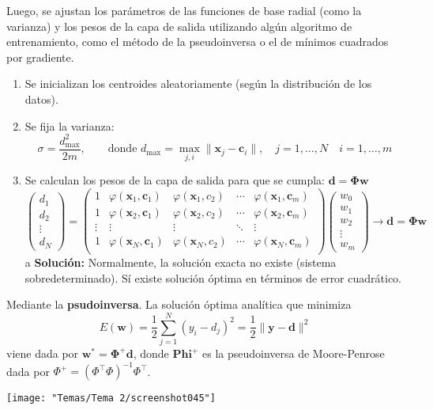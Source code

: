 Luego, se ajustan los parámetros de las funciones de base radial (como la varianza) y los pesos de la capa de salida utilizando algún algoritmo de entrenamiento, como el método de la pseudoinversa o el de mínimos cuadrados por gradiente.
\begin{enumerate}[label=\arabic*)]
	\item Se inicializan los centroides aleatoriamente (según la distribución de los datos).
	\item Se fija la varianza: \[ \boxed{\sigma=\dfrac{d_{\max}^2}{2m}},\qquad\text{donde }d_{\max}=\max_{j,i}\|\mathbf{x}_j-\mathbf{c}_i\|,\quad j=1,\dots,N \quad i=1,\dots,m \]
	\item Se calculan los pesos de la capa de salida para que se cumpla: $\mathbf{d=\Phi w}$ \[ \begin{pmatrix}
		d_1\\
		d_2\\
		\vdots\\
		d_N
	\end{pmatrix}=\begin{pmatrix}
		1 &\varphi(\mathbf{x}_1,\mathbf{c}_1) & \varphi(\mathbf{x}_1,c_2) & \cdots & \varphi(\mathbf{x}_1,\mathbf{c}_m)\\
		1 &\varphi(\mathbf{x}_2,\mathbf{c}_1) & \varphi(\mathbf{x}_2,c_2) & \cdots & \varphi(\mathbf{x}_2,\mathbf{c}_m)\\
		\vdots & \vdots & \vdots & \ddots & \vdots\\
		1 & \varphi(\mathbf{x}_N,\mathbf{c}_1) & \varphi(\mathbf{x}_N,c_2) & \cdots & \varphi(\mathbf{x}_N,\mathbf{c}_m)\\
	\end{pmatrix}\begin{pmatrix}
		w_0\\
		w_1\\
		w_2\\
		\vdots\\
		w_m
	\end{pmatrix}\longrightarrow\mathbf{d=\Phi w} \]a
	\textbf{Solución:} Normalmente, la solución exacta no existe (sistema sobredeterminado). Sí existe solución óptima en términos de error cuadrático.
\end{enumerate}
\begin{minipage}{0.65\textwidth}
Mediante la \textbf{psudoinversa}. La solución óptima analítica que minimiza \[ E(\mathbf{w})=\dfrac{1}{2}\sum_{j=1}^{N}(y_i-d_j)^2=\dfrac{1}{2}\|\mathbf{y-d}\|^2 \]viene dada por $\mathbf{w^*=\Phi^+d}$, donde $\mathbf{Phi^+}$ es la pseudoinversa de Moore-Penrose dada por $\Phi^+=(\Phi^\intercal\Phi)^{-1}\Phi^\intercal$.
\end{minipage}\qquad\begin{minipage}{0.3\textwidth}
\begin{center}
	\texttt{[image: "Temas/Tema 2/screenshot045"]}
\end{center}
\end{minipage}

